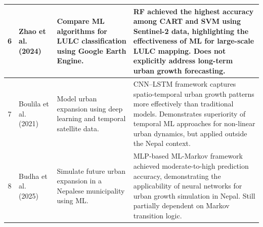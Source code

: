 \documentclass[main]{subfiles}
\begin{document}
\begin{longtable}{|c|p{2.8cm}|p{4.2cm}|p{5cm}|}
6 &
Zhao et al. (2024)~\cite{ZHAO2024129} &
Compare ML algorithms for LULC classification using Google Earth Engine. &
RF achieved the highest accuracy among CART and SVM using Sentinel-2 data, highlighting the effectiveness of ML for large-scale LULC mapping. Does not explicitly address long-term urban growth forecasting. \\
\hline

7 &
Boulila et al. (2021)~\cite{BOULILA2021101325} &
Model urban expansion using deep learning and temporal satellite data. &
CNN--LSTM framework captures spatio-temporal urban growth patterns more effectively than traditional models. Demonstrates superiority of temporal ML approaches for non-linear urban dynamics, but applied outside the Nepal context. \\
\hline

8 &
Budha et al. (2025)~\cite{Budha2025} &
Simulate future urban expansion in a Nepalese municipality using ML. &
MLP-based ML-Markov framework achieved moderate-to-high prediction accuracy, demonstrating the applicability of neural networks for urban growth simulation in Nepal. Still partially dependent on Markov transition logic. \\
\hline

\end{longtable}
\end{document}
